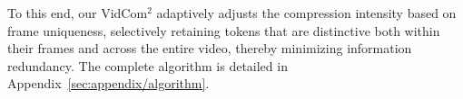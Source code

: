 To this end, our VidCom$^2$ adaptively adjusts the compression intensity based on frame uniqueness, selectively retaining tokens that are distinctive both within their frames and across the entire video, thereby minimizing information redundancy. The complete algorithm is detailed in Appendix~\ref{sec:appendix/algorithm}.



